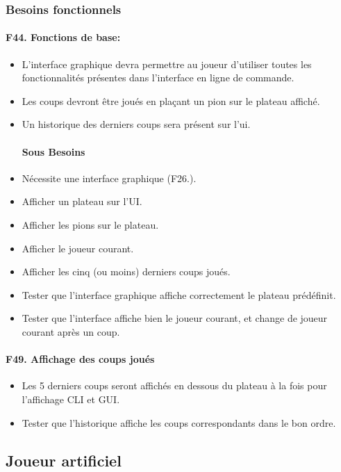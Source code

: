 \documentclass[a4paper,12pt]{article}
\begin{document}
\subsubsection{Besoins fonctionnels}

\paragraph{F44. Fonctions de base:}
\begin{itemize}
  \item L'interface graphique devra permettre au joueur d'utiliser toutes les
        fonctionnalités présentes dans l'interface en ligne de commande.
  \item Les coups devront être joués en plaçant un pion sur le plateau affiché.
  \item Un historique des derniers coups sera présent sur l'ui.
        \paragraph{Sous Besoins}
  \item Nécessite une interface graphique (F26.).
  \item Afficher un plateau sur l'UI.
  \item Afficher les pions sur le plateau.
  \item Afficher le joueur courant.
  \item Afficher les cinq (ou moins) derniers coups joués.
  \item Tester que l'interface graphique affiche correctement le plateau prédéfinit.
  \item Tester que l'interface affiche bien le joueur courant, et change de joueur
        courant après un coup.
\end{itemize}

\paragraph{F49. Affichage des coups joués}
\begin{itemize}
  \item Les 5 derniers coups seront affichés en dessous du plateau à la fois pour
        l'affichage CLI et GUI.
  \item Tester que l'historique affiche les coups correspondants dans le bon ordre.
\end{itemize}

\subsection{Joueur artificiel}
\end{document}
